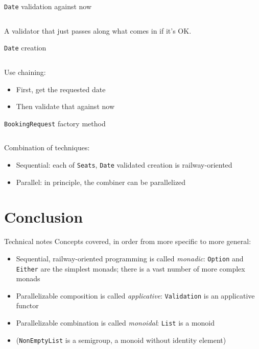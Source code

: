 \begin{frame}{\texttt{Date} validation against now}
  \inputminted{scala}{BookingRequestTimely.scala}

  A validator that just passes along what comes in if it's OK.
\end{frame}

\begin{frame}{\texttt{Date} creation}
  \inputminted{scala}{BookingRequestFactoryDate.scala}

  Use chaining:
  \begin{itemize}
  \item First, get the requested date
  \item Then validate that against now
  \end{itemize}
\end{frame}

\begin{frame}{\texttt{BookingRequest} factory method}
  \inputminted{scala}{BookingRequestFactory.scala}

  Combination of techniques:
  \begin{itemize}
  \item Sequential: each of \texttt{Seats},
    \texttt{Date} validated creation is railway-oriented
  \item Parallel: in principle, the combiner can be parallelized
  \end{itemize}
\end{frame}


\section{Conclusion}

\begin{frame}{Technical notes}
  Concepts covered, in order from more specific to more general:

  \begin{itemize}
  \item Sequential, railway-oriented programming is called
    \emph{monadic}: \texttt{Option} and \texttt{Either} are the
    simplest monads; there is a vast number of more complex monads
  \item Parallelizable composition is called \emph{applicative}:
    \texttt{Validation} is an applicative functor
  \item Parallelizable combination is called \emph{monoidal}:
    \texttt{List} is a monoid
  \item (\texttt{NonEmptyList} is a semigroup, a monoid without
    identity element)
  \end{itemize}
\end{frame}

